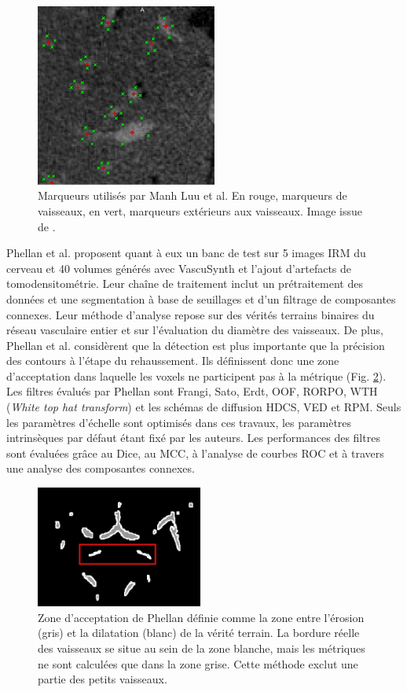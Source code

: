 \begin{figure}[!ht]
  \centering
  \includegraphics[height=6cm]{Images/ManhLuu_markers.png}
  \caption{Marqueurs utilisés par Manh Luu et al. En rouge, marqueurs de vaisseaux, en vert, marqueurs extérieurs aux vaisseaux. Image issue de \cite{Luu2015_liver_vesselness_comparison}. }
  \label{fig:ManhLuu_markers}
\end{figure}

Phellan et al. \cite{Phellan2017_Brain_vesselness_comparison} proposent quant à eux un banc de test sur 5 images IRM du cerveau et 40 volumes générés avec VascuSynth et l'ajout d'artefacts de tomodensitométrie. Leur chaîne de traitement inclut un prétraitement des données et une segmentation à base de seuillages et d'un filtrage de composantes connexes. Leur méthode d'analyse repose sur des vérités terrains binaires du réseau vasculaire entier et sur l'évaluation du diamètre des vaisseaux. De plus, Phellan et al. considèrent que la détection est plus importante que la précision des contours à l'étape du rehaussement. Ils définissent donc une zone d'acceptation dans laquelle les voxels ne participent pas à la métrique (Fig. \ref{fig:Phellan_acceptance_zone}). Les filtres évalués par Phellan sont Frangi, Sato, Erdt, OOF, RORPO, WTH (\textit{White top hat transform}) \cite{Soille1999_WTH} et les schémas de diffusion HDCS, VED et RPM. Seuls les paramètres d'échelle sont optimisés dans ces travaux, les paramètres intrinsèques par défaut étant fixé par les auteurs. Les performances des filtres sont évaluées grâce au Dice, au MCC, à l'analyse de courbes ROC et à travers une analyse des composantes connexes.

\begin{figure}[!ht]
  \centering
  \includegraphics[height=4cm]{Images/Phellan_comparison.jpg}
  \caption{Zone d'acceptation de Phellan définie comme la zone entre l'érosion (gris) et la dilatation (blanc) de la vérité terrain. La bordure réelle des vaisseaux se situe au sein de la zone blanche, mais les métriques ne sont calculées que dans la zone grise. Cette méthode exclut une partie des petits vaisseaux.}
  \label{fig:Phellan_acceptance_zone}
\end{figure}

